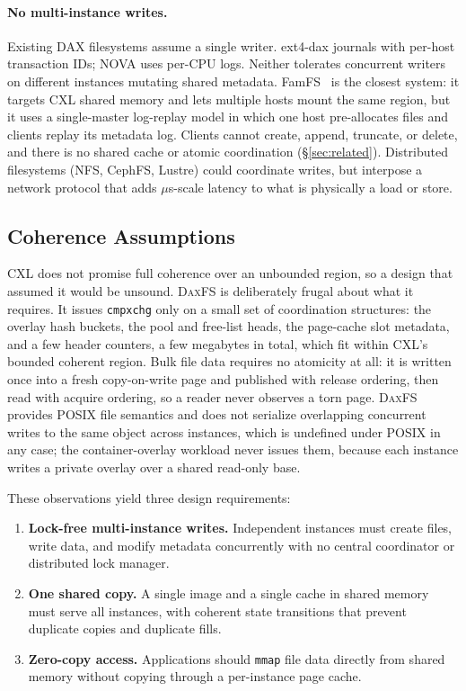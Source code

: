 \documentclass[letterpaper,twocolumn,10pt]{article}
\newcommand{\daxfs}{\textsc{DaxFS}\xspace}
\begin{document}
\paragraph{No multi-instance writes.}
Existing DAX filesystems assume a single writer.  ext4-dax journals
with per-host transaction IDs; NOVA uses per-CPU logs.  Neither
tolerates concurrent writers on different instances mutating shared
metadata.  FamFS~\cite{groves24:Famfs} is the closest system: it
targets CXL shared memory and lets multiple hosts mount the same
region, but it uses a single-master log-replay model in which one host
pre-allocates files and clients replay its metadata log.  Clients
cannot create, append, truncate, or delete, and there is no shared
cache or atomic coordination (\S\ref{sec:related}).  Distributed
filesystems (NFS, CephFS, Lustre) could coordinate writes, but
interpose a network protocol that adds $\mu$s-scale latency to what is
physically a load or store.

\subsection{Coherence Assumptions}
\label{sec:coherence-assume}

CXL does not promise full coherence over an unbounded region, so a
design that assumed it would be unsound.  \daxfs is deliberately frugal
about what it requires.  It issues \texttt{cmpxchg} only on a small set
of coordination structures: the overlay hash buckets, the pool and
free-list heads, the page-cache slot metadata, and a few header
counters, a few megabytes in total, which fit within CXL's bounded
coherent region.  Bulk file data requires no atomicity at all: it is
written once into a fresh copy-on-write page and published with release
ordering, then read with acquire ordering, so a reader never observes a
torn page.  \daxfs provides POSIX file semantics and does not serialize
overlapping concurrent writes to the same object across instances,
which is undefined under POSIX in any case; the container-overlay
workload never issues them, because each instance writes a private
overlay over a shared read-only base.

These observations yield three design requirements:
\begin{enumerate}
\item \textbf{Lock-free multi-instance writes.}  Independent instances
  must create files, write data, and modify metadata concurrently with
  no central coordinator or distributed lock manager.
\item \textbf{One shared copy.}  A single image and a single cache in
  shared memory must serve all instances, with coherent state
  transitions that prevent duplicate copies and duplicate fills.
\item \textbf{Zero-copy access.}  Applications should \texttt{mmap}
  file data directly from shared memory without copying through a
  per-instance page cache.
\end{enumerate}
\end{document}
